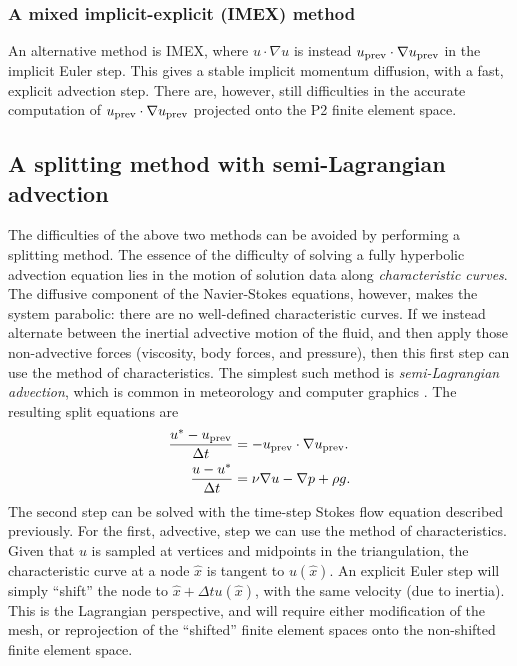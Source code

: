 \subsubsection{A mixed implicit-explicit (IMEX) method}
An alternative method is IMEX, where $u\cdot \nabla u$ is instead ${u_{\text{prev}}} \cdot \nabla {u_{\text{prev}}}$ in the implicit Euler step.
This gives a stable implicit momentum diffusion, with a fast, explicit advection step. There are, however, still difficulties in the accurate computation
of ${u_{\text{prev}}} \cdot \nabla {u_{\text{prev}}}$ projected onto the P2 finite element space.

\subsection{A splitting method with semi-Lagrangian advection}
The difficulties of the above two methods can be avoided by performing a splitting method.
The essence of the difficulty of solving a fully hyperbolic advection equation lies in the motion of solution data along \textit{characteristic curves}.
The diffusive component of the Navier-Stokes equations, however, makes the system parabolic: there are no well-defined characteristic curves.
If we instead alternate between 
the inertial advective motion of the fluid,
and then apply those non-advective forces (viscosity, body forces, and pressure),
then this first step can use the method of characteristics. The simplest such method is \textit{semi-Lagrangian advection},
which is common in meteorology and computer graphics \cite{stam_stable_fluids}.
The resulting split equations are
\begin{equation}
\begin{split}
    \frac{u^* - {u_{\text{prev}}}}{\Delta t} &= -{u_{\text{prev}}}\cdot \nabla{u_{\text{prev}}}. \\
    \frac{u - u^*}{\Delta t} &= \nu \nabla u -\nabla p + \rho g.
\end{split}
\end{equation}
The second step can be solved with the time-step Stokes flow equation described previously. For the first, advective, step
we can use the method of characteristics. Given that $u$ is sampled at vertices and midpoints in the triangulation, the characteristic curve
at a node $\hat{x}$ is tangent to $u(\hat{x})$. An explicit Euler step will simply ``shift'' the node to $\hat{x} + \Delta t u(\hat{x})$,
with the same velocity (due to inertia).
This is the Lagrangian perspective, and will require either modification of the mesh, or reprojection of the ``shifted''
finite element spaces onto the non-shifted finite element space.
